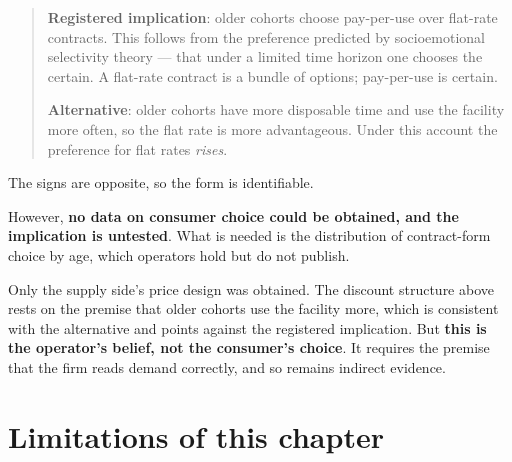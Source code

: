 \begin{quote}
\textbf{Registered implication}: older cohorts choose pay-per-use over flat-rate contracts. This
follows from the preference predicted by socioemotional selectivity theory — that under a limited
time horizon one chooses the certain. A flat-rate contract is a bundle of options; pay-per-use is
certain.

\textbf{Alternative}: older cohorts have more disposable time and use the facility more often, so
the flat rate is more advantageous. Under this account the preference for flat rates
\emph{rises}.
\end{quote}

The signs are opposite, so the form is identifiable.

However, \textbf{no data on consumer choice could be obtained, and the implication is untested}.
What is needed is the distribution of contract-form choice by age, which operators hold but do not
publish.

Only the supply side's price design was obtained. The discount structure above rests on the
premise that older cohorts use the facility more, which is consistent with the alternative and
points against the registered implication. But \textbf{this is the operator's belief, not the
consumer's choice}. It requires the premise that the firm reads demand correctly, and so remains
indirect evidence.

\section{Limitations of this chapter}

